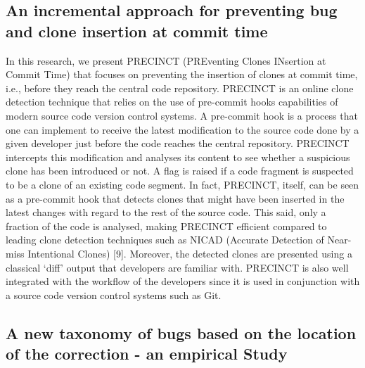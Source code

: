 \subsection{An incremental approach for preventing bug and clone insertion at commit time}
In this research, we present PRECINCT (PREventing Clones INsertion at Commit Time) that focuses on preventing the
insertion of clones at commit time, i.e., before they reach the central code repository. PRECINCT is an online clone
detection technique that relies on the use of pre-commit hooks capabilities of modern source code version control systems.
A pre-commit hook is a process that one can implement to receive the latest modification to the source code done by a given developer just before the code reaches the central repository. PRECINCT intercepts this modification and analyses its content to see whether a suspicious clone has been introduced
or not. A flag is raised if a code fragment is suspected to be a clone of an existing code segment. In fact, PRECINCT, itself, can be seen as a pre-commit hook that detects clones that might have been inserted in the latest changes with regard to the rest of the source code. This said, only a fraction of the
code is analysed, making PRECINCT efficient compared to leading clone detection techniques such as NICAD (Accurate Detection of Near-miss Intentional Clones) [9]. Moreover, the detected clones are presented using a classical ‘diff’ output that developers are familiar with. PRECINCT is also well
integrated with the workflow of the developers since it is used in conjunction with a source code version control systems such as Git.

\subsection{A new taxonomy of bugs based on the location of the correction - an empirical Study}

